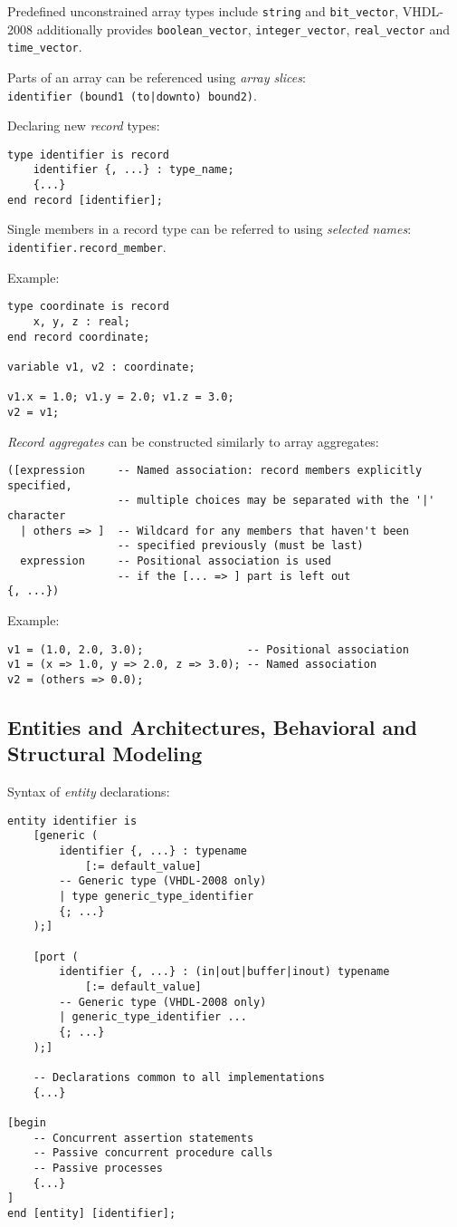 \documentclass[fontsize=11pt,a4paper]{scrartcl}
\begin{document}
Predefined unconstrained array types include \lstinline!string! and \lstinline!bit_vector!, VHDL-2008 additionally provides \lstinline!boolean_vector!, \lstinline!integer_vector!, \lstinline!real_vector! and \lstinline!time_vector!.

Parts of an array can be referenced using \emph{array slices}:\\ \lstinline!identifier (bound1 (to|downto) bound2)!.

Declaring new \emph{record} types:
\begin{lstlisting}
type identifier is record
	identifier {, ...} : type_name;
	{...}
end record [identifier];
\end{lstlisting}

Single members in a record type can be referred to using \emph{selected names}: \lstinline!identifier.record_member!.

Example:
\begin{lstlisting}
type coordinate is record
	x, y, z : real;
end record coordinate;

variable v1, v2 : coordinate;

v1.x = 1.0; v1.y = 2.0; v1.z = 3.0;
v2 = v1;
\end{lstlisting}

\emph{Record aggregates} can be constructed similarly to array aggregates:
\begin{lstlisting}
([expression     -- Named association: record members explicitly specified,
                 -- multiple choices may be separated with the '|' character
  | others => ]  -- Wildcard for any members that haven't been
                 -- specified previously (must be last)
  expression     -- Positional association is used
                 -- if the [... => ] part is left out
{, ...})
\end{lstlisting}

Example:
\begin{lstlisting}
v1 = (1.0, 2.0, 3.0);                -- Positional association
v1 = (x => 1.0, y => 2.0, z => 3.0); -- Named association
v2 = (others => 0.0);
\end{lstlisting}
%
%
%
%
\newpage
\subsection{Entities and Architectures, Behavioral and Structural Modeling}
Syntax of \emph{entity} declarations:
\begin{lstlisting}
entity identifier is
	[generic (
		identifier {, ...} : typename
			[:= default_value]
		-- Generic type (VHDL-2008 only)
		| type generic_type_identifier
		{; ...}
	);]

	[port (
		identifier {, ...} : (in|out|buffer|inout) typename
			[:= default_value]
		-- Generic type (VHDL-2008 only)
		| generic_type_identifier ...
		{; ...}
	);]

	-- Declarations common to all implementations
	{...}

[begin
	-- Concurrent assertion statements
	-- Passive concurrent procedure calls
	-- Passive processes
	{...}
]
end [entity] [identifier];
\end{lstlisting}
\end{document}
